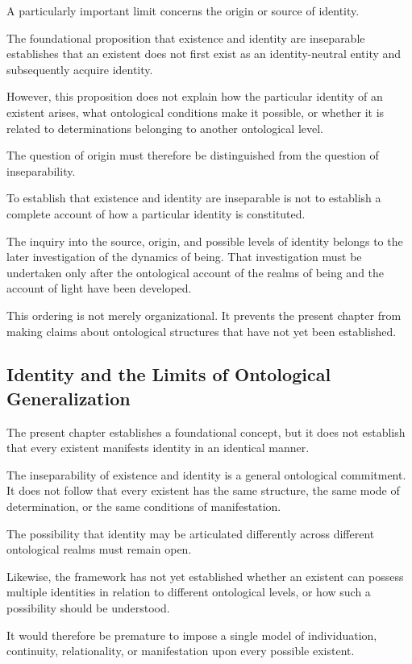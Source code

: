 A particularly important limit concerns the origin or source of identity.

The foundational proposition that existence and identity are inseparable establishes that an existent does not first exist as an identity-neutral entity and subsequently acquire identity.

However, this proposition does not explain how the particular identity of an existent arises, what ontological conditions make it possible, or whether it is related to determinations belonging to another ontological level.

The question of origin must therefore be distinguished from the question of inseparability.

To establish that existence and identity are inseparable is not to establish a complete account of how a particular identity is constituted.

The inquiry into the source, origin, and possible levels of identity belongs to the later investigation of the dynamics of being. That investigation must be undertaken only after the ontological account of the realms of being and the account of light have been developed.

This ordering is not merely organizational. It prevents the present chapter from making claims about ontological structures that have not yet been established.

\subsection{Identity and the Limits of Ontological Generalization}

The present chapter establishes a foundational concept, but it does not establish that every existent manifests identity in an identical manner.

The inseparability of existence and identity is a general ontological commitment. It does not follow that every existent has the same structure, the same mode of determination, or the same conditions of manifestation.

The possibility that identity may be articulated differently across different ontological realms must remain open.

Likewise, the framework has not yet established whether an existent can possess multiple identities in relation to different ontological levels, or how such a possibility should be understood.

It would therefore be premature to impose a single model of individuation, continuity, relationality, or manifestation upon every possible existent.

